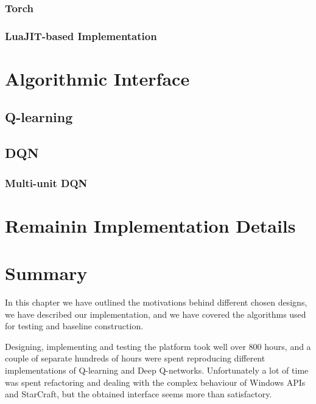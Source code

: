 \subsubsection{Torch}

\subsubsection{LuaJIT-based Implementation}

\section{Algorithmic Interface}

\subsection{Q-learning}

\subsection{DQN}

\subsubsection{Multi-unit DQN}

\section{Remainin Implementation Details}

\section{Summary}

In this chapter we have outlined the motivations behind different chosen
designs, we have described our implementation, and we have covered the algorithms
used for testing and baseline construction.

Designing, implementing and testing the platform took well over 800 hours, and a
couple of separate hundreds of hours were spent reproducing different
implementations of Q-learning and Deep Q-networks. Unfortunately a lot of time
was spent refactoring and dealing with the complex behaviour of Windows APIs and
StarCraft, but the obtained interface seems more than satisfactory.
